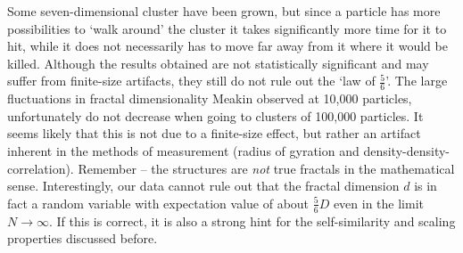 \documentclass[twocolumn, 10pt]{scrartcl}
\begin{document}
                Some seven-dimensional cluster have been grown, but since a particle has more possibilities to `walk
                around' the cluster it takes significantly more time for it to hit, while it does not necessarily has to
                move far away from it where it would be killed. Although the results obtained are not statistically
                significant and may suffer from finite-size artifacts, they still do not rule out the `law of $\frac{5}{6}$'.
                The large fluctuations in fractal dimensionality Meakin observed at 10,000 particles, unfortunately
                do not decrease when going to clusters of 100,000 particles. It seems likely that this is not due to
                a finite-size effect, but rather an artifact inherent in the methods of measurement (radius of gyration
                and density-density-correlation). Remember -- the structures are \emph{not} true fractals in the
                mathematical sense. Interestingly, our data cannot rule out that the fractal dimension $d$ is in fact
                a random variable with expectation value of about $\frac{5}{6}D$ even in the limit
                $N\rightarrow\infty$. If this is correct, it is also a strong hint for the self-similarity and scaling
                properties discussed before.
\end{document}
